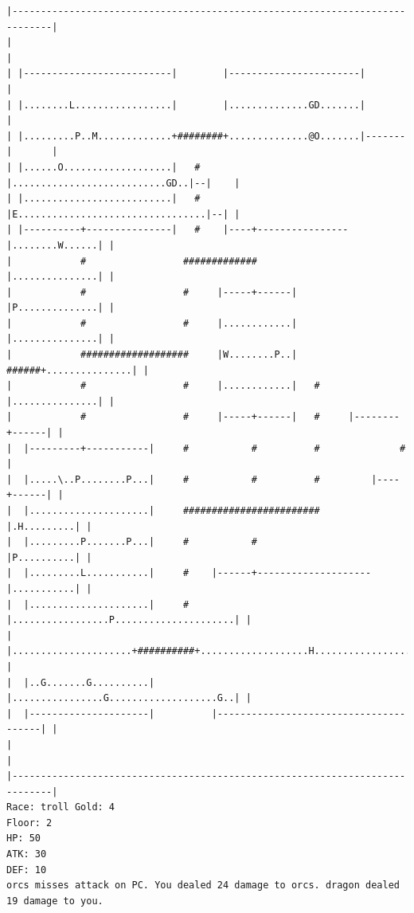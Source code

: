 \documentclass[11pt]{article}
\theoremstyle{plain}
\begin{document}
\begin{Verbatim}[fontsize=\scriptsize]
|-----------------------------------------------------------------------------|
|                                                                             |
| |--------------------------|        |-----------------------|               |
| |........L.................|        |..............GD.......|               |
| |.........P..M.............+########+..............@O.......|-------|       |
| |......O...................|   #    |...........................GD..|--|    |
| |..........................|   #    |E.................................|--| |
| |----------+---------------|   #    |----+----------------|........W......| |
|            #                 #############                |...............| |
|            #                 #     |-----+------|         |P..............| |
|            #                 #     |............|         |...............| |
|            ###################     |W........P..|   ######+...............| |
|            #                 #     |............|   #     |...............| |
|            #                 #     |-----+------|   #     |--------+------| |
|  |---------+-----------|     #           #          #              #        |
|  |.....\..P........P...|     #           #          #         |----+------| |
|  |.....................|     ########################         |.H.........| |
|  |.........P.......P...|     #           #                    |P..........| |
|  |.........L...........|     #    |------+--------------------|...........| |
|  |.....................|     #    |.................P.....................| |
|  |.....................+##########+...................H...................| |
|  |..G.......G..........|          |................G...................G..| |
|  |---------------------|          |---------------------------------------| |
|                                                                             |
|-----------------------------------------------------------------------------|
Race: troll Gold: 4                                                    Floor: 2
HP: 50
ATK: 30
DEF: 10
orcs misses attack on PC. You dealed 24 damage to orcs. dragon dealed 19 damage to you. 
\end{Verbatim}
\newpage
\end{document}
